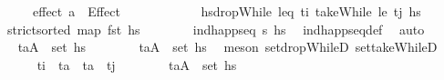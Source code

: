 \begin{isabellebody}
\ \ \ \ \ {\isachardoublequoteopen}effect\ a\ {\isacharequal}{\kern0pt}\ Effect\ {\isacharbrackleft}{\kern0pt}{\isacharbrackright}{\kern0pt}\ {\isacharbrackleft}{\kern0pt}{\isacharbrackright}{\kern0pt}{\isachardoublequoteclose}\isanewline
%
\isadelimproof
\ \ %
\endisadelimproof
%
\isatagproof
{}\isamarkupfalse%
\ {\isacharminus}{\kern0pt}\isanewline
\ \ \ \ \isamarkupfalse%
\ {\isacharquery}{\kern0pt}hs{\isacharprime}{\kern0pt}{\isacharequal}{\kern0pt}{\isachardoublequoteopen}dropWhile\ {\isacharparenleft}{\kern0pt}leq\ t\isactrlsub i{\isacharparenright}{\kern0pt}\ {\isacharparenleft}{\kern0pt}takeWhile\ {\isacharparenleft}{\kern0pt}le\ t\isactrlsub j{\isacharparenright}{\kern0pt}\ hs{\isacharparenright}{\kern0pt}{\isachardoublequoteclose}\isanewline
\ \ \ \ \isamarkupfalse%
\ {\isachardoublequoteopen}strict{\isacharunderscore}{\kern0pt}sorted\ {\isacharparenleft}{\kern0pt}map\ fst\ hs{\isacharparenright}{\kern0pt}{\isachardoublequoteclose}\isanewline
\ \ \ \ \ \ \isamarkupfalse%
\ {\isacartoucheopen}ind{\isacharunderscore}{\kern0pt}happ{\isacharunderscore}{\kern0pt}seq\ {\isasympi}s\ hs{\isacartoucheclose}\ \isamarkupfalse%
\ ind{\isacharunderscore}{\kern0pt}happ{\isacharunderscore}{\kern0pt}seq{\isacharunderscore}{\kern0pt}def\ \isamarkupfalse%
\ auto\isanewline
\ \ \ \ \isamarkupfalse%
\ \isamarkupfalse%
\ {\isachardoublequoteopen}{\isacharparenleft}{\kern0pt}t\isactrlsub a{\isacharcomma}{\kern0pt}A{\isacharparenright}{\kern0pt}\ {\isasymin}\ set\ hs{\isachardoublequoteclose}\isanewline
\ \ \ \ \ \ \isamarkupfalse%
\ {\isacartoucheopen}{\isacharparenleft}{\kern0pt}t\isactrlsub a{\isacharcomma}{\kern0pt}A{\isacharparenright}{\kern0pt}\ {\isasymin}\ set\ {\isacharquery}{\kern0pt}hs{\isacharprime}{\kern0pt}{\isacartoucheclose}\ \isamarkupfalse%
\ {\isacharparenleft}{\kern0pt}meson\ set{\isacharunderscore}{\kern0pt}dropWhileD\ set{\isacharunderscore}{\kern0pt}takeWhileD{\isacharparenright}{\kern0pt}\isanewline
\ \ \ \ \isamarkupfalse%
\ {\isachardoublequoteopen}t\isactrlsub i\ {\isacharless}{\kern0pt}\ t\isactrlsub a\ {\isasymand}\ t\isactrlsub a\ {\isacharless}{\kern0pt}\ t\isactrlsub j{\isachardoublequoteclose}\isanewline
\ \ \ \ \ \ \isamarkupfalse%
\ {\isacartoucheopen}{\isacharparenleft}{\kern0pt}t\isactrlsub a{\isacharcomma}{\kern0pt}A{\isacharparenright}{\kern0pt}\ {\isasymin}\ set\ {\isacharquery}{\kern0pt}hs{\isacharprime}{\kern0pt}{\isacartoucheclose}\isanewline

\end{isabellebody}
